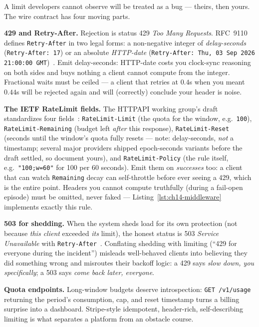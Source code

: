 A limit developers cannot observe will be treated as a bug --- theirs, then
yours. The wire contract has four moving parts.

\textbf{429 and Retry-After.} Rejection is status 429 \emph{Too Many
Requests}. RFC~9110 defines \texttt{Retry-After} in two legal forms: a
non-negative integer of \emph{delay-seconds}
(\texttt{Retry-After: 17}) or an absolute \emph{HTTP-date}
(\texttt{Retry-After: Thu, 03 Sep 2026 21:00:00 GMT})~\cite{rfc9110}.
Emit delay-seconds: HTTP-date costs you clock-sync reasoning on both sides
and buys nothing a client cannot compute from the integer. Fractional waits
must be ceiled --- a client that retries at $0.4$s when you meant $0.44$s
will be rejected again and will (correctly) conclude your header is noise.

\textbf{The IETF RateLimit fields.} The HTTPAPI working group's draft
standardizes four fields~\cite{ietf_ratelimit_headers}:
\texttt{RateLimit-Limit} (the quota for the window, e.g.\ \texttt{100}),
\texttt{RateLimit-Remaining} (budget left \emph{after} this response),
\texttt{RateLimit-Reset} (seconds until the window's quota fully resets ---
note: delay-seconds, \emph{not} a timestamp; several major providers shipped
epoch-seconds variants before the draft settled, so document yours), and
\texttt{RateLimit-Policy} (the rule itself, e.g.\ \texttt{"100;w=60"} for
100 per 60 seconds). Emit them on \emph{successes} too: a client that can
watch \texttt{Remaining} decay can self-throttle before ever seeing a 429,
which is the entire point. Headers you cannot compute truthfully (during a
fail-open episode) must be omitted, never faked --- Listing~\ref{lst:ch14-middleware}
implements exactly this rule.

\textbf{503 for shedding.} When the system sheds load for its own
protection (not because \emph{this client} exceeded \emph{its} limit), the
honest status is 503 \emph{Service Unavailable} with
\texttt{Retry-After}~\cite{rfc9110}. Conflating shedding with limiting
(``429 for everyone during the incident'') misleads well-behaved clients
into believing they did something wrong and misroutes their backoff logic:
a 429 says \emph{slow down, you specifically}; a 503 says \emph{come back
later, everyone}.

\textbf{Quota endpoints.} Long-window budgets deserve introspection:
\texttt{GET /v1/usage} returning the period's consumption, cap, and reset
timestamp turns a billing surprise into a dashboard. Stripe-style
idempotent, header-rich, self-describing limiting is what separates a
platform from an obstacle course.

